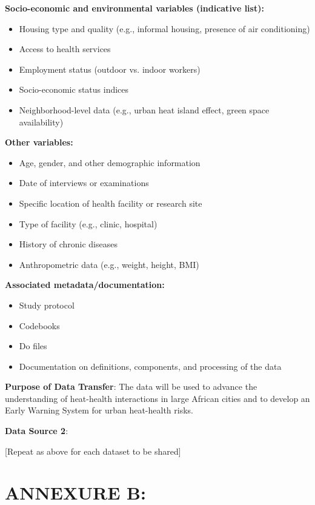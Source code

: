 \documentclass[12pt,letterpaper]{article}
\begin{document}
\textbf{Socio-economic and environmental variables (indicative list):}
\begin{itemize}
    \item Housing type and quality (e.g., informal housing, presence of air conditioning)
    \item Access to health services
    \item Employment status (outdoor vs. indoor workers)
    \item Socio-economic status indices
    \item Neighborhood-level data (e.g., urban heat island effect, green space availability)
\end{itemize}

\textbf{Other variables:}
\begin{itemize}
    \item Age, gender, and other demographic information
    \item Date of interviews or examinations
    \item Specific location of health facility or research site
    \item Type of facility (e.g., clinic, hospital)
    \item History of chronic diseases
    \item Anthropometric data (e.g., weight, height, BMI)
\end{itemize}

\textbf{Associated metadata/documentation:}
\begin{itemize}
    \item Study protocol
    \item Codebooks
    \item Do files
    \item Documentation on definitions, components, and processing of the data
\end{itemize}

\textbf{Purpose of Data Transfer}: The data will be used to advance the understanding of heat-health interactions in large African cities and to develop an Early Warning System for urban heat-health risks.

\textbf{Data Source 2}:

[Repeat as above for each dataset to be shared]

\newpage

\section*{ANNEXURE B:}
\end{document}
